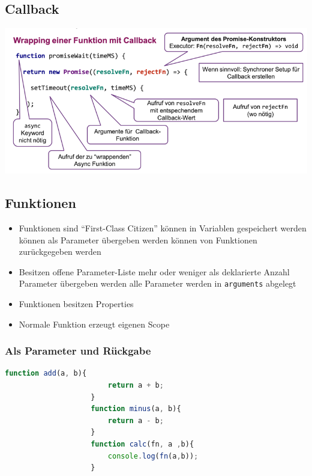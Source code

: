 \documentclass[a4paper, landscape, 8pt]{scrartcl}
\begin{document}
\begin{multicols*}{4}
        \subsection{Callback}
        \includegraphics[width=\columnwidth]{graphic/34-wrapping-function-with-callback}

        \subsection{Funktionen}
        \begin{itemize}
            \item Funktionen sind \enquote{First-Class Citizen}
            \subitem können in Variablen gespeichert werden
            \subitem können als Parameter übergeben werden
            \subitem können von Funktionen zurückgegeben werden
            \item Besitzen offene Parameter-Liste
            \subitem mehr oder weniger als deklarierte Anzahl Parameter übergeben werden
            \subitem alle Parameter werden in \texttt{arguments} abgelegt
            \item Funktionen besitzen Properties
            \item Normale Funktion erzeugt eigenen Scope
        \end{itemize}

        \subsubsection{Als Parameter und Rückgabe}
        \begin{lstlisting}[language=JavaScript]
                    function add(a, b){
                        return a + b;
                    }
                    function minus(a, b){
                        return a - b;
                    }
                    function calc(fn, a ,b){
                        console.log(fn(a,b));
                    }


\end{lstlisting}
\end{multicols*}
\end{document}

